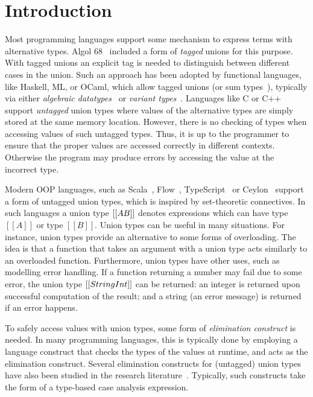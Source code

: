 \section{Introduction}
\label{sec:intro}

Most programming languages support some mechanism to express terms
with alternative types. Algol 68~\cite{} included a form of
\emph{tagged} unions for this purpose. With tagged unions
an explicit tag is needed to distinguish between different cases in the
union. Such an approach has been adopted by functional languages, like Haskell, ML, or
OCaml, which allow tagged unions (or sum types~\cite{}), typically via
either \emph{algebraic datatypes}~\cite{} or \emph{variant types}~\cite{}.
Languages like C or C++ support \emph{untagged} union types where
values of the alternative types are simply stored at the same memory
location. However, there is no checking of types when accessing values of
such untagged types. Thus, it is up to the programmer to ensure that the proper
values are accessed correctly in different contexts. Otherwise the
program may produce errors by accessing the value at the incorrect type.

Modern OOP languages, such as Scala~\cite{}, Flow~\cite{},
TypeScript~\cite{} or Ceylon~\cite{} support a form
of untagged union types, which is inspired by set-theoretic connectives.
In such languages a union type $[[A \/ B]]$ denotes expressions which can have type
$[[A]]$ or type $[[B]]$. Union types can be useful in many situations.
For instance, union types provide an alternative to some forms
of overloading. The idea is that a function that takes an argument
with a union type acts similarly to an overloaded function.
Furthermore, union types have other uses, such as modelling error handling.
If a function returning a number may fail due to some
error, the union type $[[String \/ Int]]$ can be returned: an integer
is returned upon successful computation of the result; and
a string (an error message) is returned if an error happens.

To safely access values with union types, some form of
\emph{elimination construct} is needed. In many programming languages,
this is typically done by employing a language construct that checks
the types of the values at runtime, and acts as the elimination
construct. Several elimination constructs for (untagged) union types
have also been studied in the research literature~\cite{}. Typically,
such constructs take the form of a type-based case analysis
expression.

